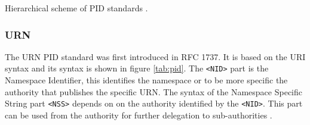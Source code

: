 \begin {table}[H]
\caption {Hierarchical scheme of PID standards \cite{icn-bd}.} \label{tab:pid} 
\begin{center}
\end{center}
\end {table}



\subsubsection{URN}
The URN PID standard was first introduced in RFC 1737. It is based on the URI syntax and its syntax is shown in figure \ref{tab:pid}. The \texttt{\textless NID\textgreater} part is the Namespace Identifier, this identifies the namespace or to be more specific the authority that publishes the specific URN.
The syntax of the Namespace Specific String part \texttt{\textless NSS\textgreater} depends on on the authority identified by the \texttt{\textless NID\textgreater}. This part can be used from the authority for further delegation to sub-authorities \cite{icn-bd}.

